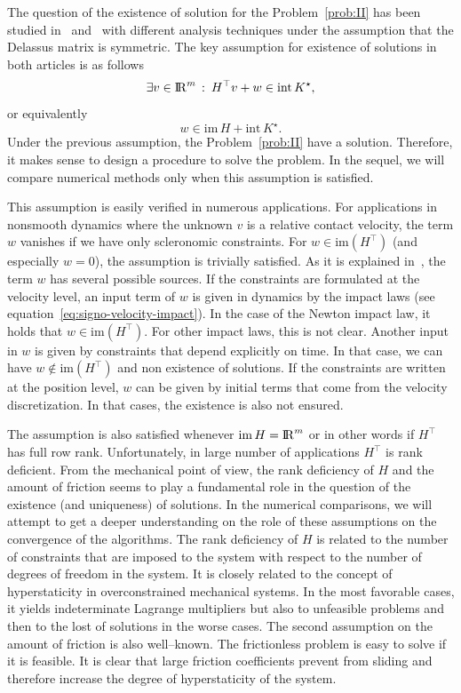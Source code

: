 {The question of the existence of solution for the Problem~\ref{prob:II} has been studied in~\cite{Klarbring.Pang1998} and~\cite{Acary.ea_ZAMM2011} with different analysis techniques under the assumption that the Delassus matrix is symmetric.
The key assumption for existence of solutions in both articles is as follows
\begin{equation}\label{ass}
   \exists v\in \RR^m \,:\: H^\top v + w \in \mathrm{int}\, K^\star,
\end{equation}
or equivalently
\begin{equation}\label{asseq}
  w\in\mathrm{im}\, H + \mathrm{int}\, K^\star.
\end{equation}
Under the previous assumption, the Problem~\ref{prob:II} have a solution.
Therefore, it makes sense to design a procedure to solve the problem. In the sequel, we will compare numerical methods only when this assumption is satisfied.

This assumption is easily verified in numerous applications. For applications in nonsmooth dynamics where the unknown $v$ is a relative contact velocity, the term $w$ vanishes if we have only scleronomic constraints. For $w \in \mathrm{im}(H^\top)$ (and especially $w=0$), the assumption is trivially satisfied. As it is explained in~\cite{Acary.Cadoux2013}, the term $w$ has several possible sources. If the constraints are formulated at the velocity level, an input term of $w$ is given in dynamics by the impact laws (see equation~\eqref{eq:signo-velocity-impact}). In the case of the Newton impact law, it holds that $w \in \mathrm{im}(H^\top)$.   For other impact laws, this is not clear. Another input in $w$ is given by constraints that depend explicitly on time. In that case, we can have $w \not\in \mathrm{im}(H^\top)$ and non existence of solutions. If the constraints are written at the position level, $w$ can be given by initial  terms that come from the  velocity discretization. In that cases, the existence is also not ensured.

The assumption is also satisfied {whenever} $\mathrm{im}\, H = \mathrm{I\!R}^m$ or in other words if $H^\top$ has full row rank. Unfortunately, in large number of applications $H^\top$ is rank deficient. 
From the mechanical point of view, the rank deficiency of $H$ and the amount of friction seems to play a fundamental role in the question of the existence (and uniqueness) of solutions. In the numerical comparisons, we will attempt to get a deeper understanding on the role of these assumptions on the convergence of the algorithms. The rank deficiency  of $H$ is related to the number of constraints that are imposed to the system with respect to the number of degrees of freedom in the system. It is closely related to the concept of hyperstaticity in overconstrained mechanical  systems. In the most favorable cases, it yields  indeterminate Lagrange multipliers but also to unfeasible problems and then to the lost of solutions in the worse cases. The second assumption on the amount of friction is also well--known. The frictionless problem is  easy to solve if it is  feasible. It is clear that large friction coefficients prevent from sliding and therefore increase the degree of hyperstaticity of the system. 

}
